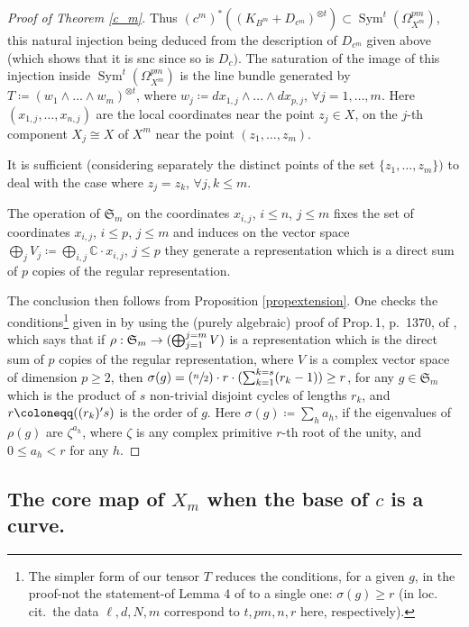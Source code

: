 \documentclass[JEP,XML,SOM,Unicode, NoEqCountersInSection,NoFloatCountersInSection,published]{cedram}
\newcommand{\NoChangel}[1]{%
\expandafter\let\csname old\string#1\endcsname=#1
\let#1=\relax
\newcommand{#1}{\mathcode`l="716C\csname old\string#1\endcsname\mathcode`l="7160 }%
}
\newcommand{\Psfrac}[2]{(\sfrac{#1}{#2})}
\DeclareMathOperator{\Gl}{Gl}\NoChangel{\Gl}
\DeclareMathOperator{\lcm}{lcm} \NoChangel{\lcm}
\DeclareMathOperator{\Sym}{Sym}
\theoremstyle{theorem}
\theoremstyle{definition}
\def\bC{{\mathbb C}}
\begin{document}
\begin{proof} [Proof of Theorem \ref{c_m}]
Thus $(c^m)^*((K_{B^m}+D_{c^m})^{\otimes t})\subset \Sym^t(\Omega^{pm}_{X^m})$, this natural injection being deduced from the description of $D_{c^m}$ given above (which shows that it is snc since so is $D_c)$. The saturation of the image of this injection inside $\Sym^t(\Omega^{pm}_{X^m})$ is the line bundle generated by $T\coloneqq (w_1\wedge \dots\wedge w_m)^{\otimes t}$, where $w_j\coloneqq dx_{1,j}\wedge\dots\wedge dx_{p,j}$, $\forall j=1,\dots,m$. Here $(x_{1,j},\dots,x_{n,j})$ are the local coordinates near the point $z_j\in X$, on the $j$-th component $X_j\cong X$ of $X^m$ near the point $(z_1,\dots,z_m)$.

It is sufficient (considering separately the distinct points of the set $\{z_1,\dots,z_m\})$ to deal with the case where $z_j=z_k$, $\forall j,k\leq m$.

The operation of $\mathfrak{S}_m$ on the coordinates $x_{i,j}$, $i\leq n$, $j\leq m$ fixes the set of coordinates $x_{i,j}$, $i\leq p$, $j\leq m$ and induces on the vector space $\bigoplus_jV_j\coloneqq \bigoplus_{i,j}\bC\cdot x_{i,j}$, $j\leq p$ they generate a representation which is a direct sum of $p$ copies of the regular representation.

The conclusion then follows from Proposition \ref{propextension}. One checks the conditions\footnote{The simpler form of our tensor $T$ reduces the conditions, for a given $g$, in the proof-not the statement-of Lemma 4 of \cite{wei86} to a single one: $\sigma(g)\geq r$ (in loc.\,cit.\ the data $\ell, d, N, m$ correspond to $t, pm, n, r$ here, respectively).} given in \cite{wei86} by using the (purely algebraic) proof of Prop.\,1, p. \,1370, of \cite{AA02}, which says that if $\rho:{\mathfrak{S}}_m\to \Gl(\bigoplus_{j=1}^{j=m}V)$ is a representation which is the direct sum of $p$ copies of the regular representation, where $V$ is a complex vector space of dimension $p\geq 2$, then $\sigma(g)=\Psfrac{n}{2}\cdot r\cdot(\sum_{k=1}^{k=s}(r_k-1))\geq r$, for any $g\in \mathfrak{S}_m$ which is the product of $s$ non-trivial disjoint cycles of lengths $r_k$, and $r\coloneqq \lcm ((r_k)'s)$ is the order of $g$.
Here $\sigma(g)\coloneqq \sum_h a_h$, if the eigenvalues of $\rho(g)$ are $\zeta^{a_h}$, where $\zeta$ is any complex primitive $r$-th root of the unity, and $0\leq a_h<r$ for any $h$. \end{proof}

\subsection{The core map of $X_m$ when the base of $c$ is a curve.}
\end{document}
